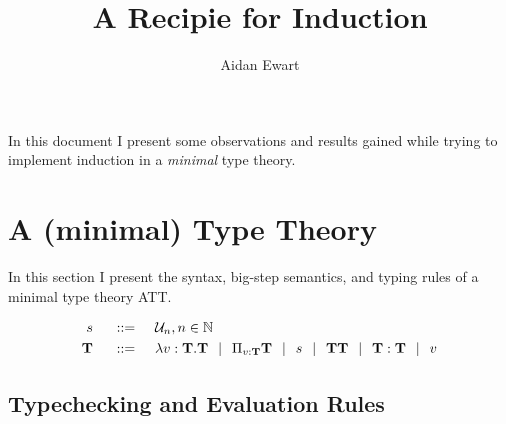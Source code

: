 \documentclass{article}
\author{Aidan Ewart}
\title{A Recipie for Induction}
\newcommand{\set}[1]{\mathcal{U}_#1}
\newcommand{\nat}{\mathbb{N}}
\newcommand{\fun}[2]{\lambda #1. #2}
\newcommand{\for}[2]{\Pi_{#1}#2}
\newcommand{\bnfdef}{\hspace{0.5cm} ::= \hspace{0.5cm}}
\newcommand{\alt}{\hspace{0.25cm} | \hspace{0.25cm}}
\newcommand{\bb}{\mathbf}
\begin{document}
\maketitle

In this document I present some observations and results gained while trying to implement induction in a \emph{minimal} type theory.

\section{A (minimal) Type Theory}
In this section I present the syntax, big-step semantics, and typing rules of a minimal type theory ATT.

\begin{align*}
    s \bnfdef& \set{n}, n \in \nat
    \\
    \bb{T} \bnfdef& \fun{v:\bb{T}}{\bb{T}} \alt \for{v : \bb{T}}{\bb{T}} \alt s \alt \bb{T T} \alt \bb{T} : \bb{T} \alt v
\end{align*}

\subsection{Typechecking and Evaluation Rules}
\end{document}
